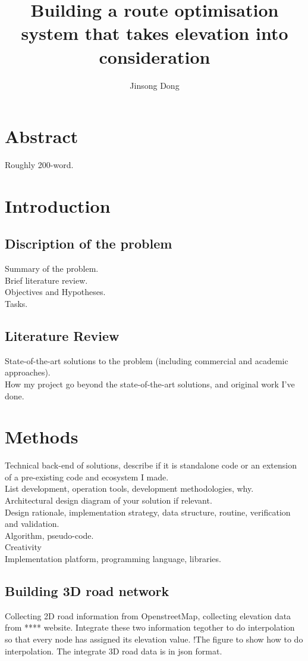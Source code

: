 \documentclass[final-report]{report-template}
\title{Building a route optimisation system that takes elevation into consideration}
\author{Jinsong Dong}
\begin{document}
\maketitlepage  %

\section* {Abstract}
Roughly 200-word.

\section {Introduction}
\subsection {Discription of the problem}
Summary of the problem.\\
Brief literature review.\\
Objectives and Hypotheses.\\
Tasks.\\
\subsection {Literature Review}
State-of-the-art solutions to the problem (including commercial and academic approaches).\\
How my project go beyond the state-of-the-art solutions, and original work I've done.\\

\section {Methods}
Technical back-end of solutions, describe if it is standalone code or an extension of a pre-existing code and ecosystem I made.\\
List development, operation tools, development methodologies, why.\\
Architectural design diagram of your solution if relevant.\\
Design rationale, implementation strategy, data structure, routine, verification and validation.\\
Algorithm, pseudo-code.\\
Creativity\\
Implementation platform, programming language, libraries.\\

\subsection {Building 3D road network}
Collecting 2D road information from OpenstreetMap, collecting elevation data from **** website. 
Integrate these two information tegother to do interpolation so that every node has assigned its elevation value.
!The figure to show how to do interpolation.
The integrate 3D road data is in json format.
\end{document}
